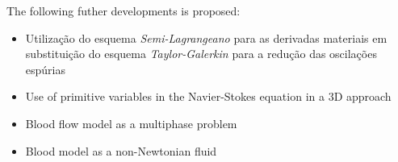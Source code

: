 \vspace{0.7cm}
\noindent
The following futher developments is proposed:

\begin{itemize}
 \vspace{-0.3cm}
 \item Utilização do esquema \textit{Semi-Lagrangeano} para as derivadas materiais
       em substituição do esquema \textit{Taylor-Galerkin}
       para a redução das oscilações espúrias  

 \item Use of primitive variables in the Navier-Stokes equation in a 3D approach
 
 \item Blood flow model as a multiphase problem

 \item Blood model as a non-Newtonian fluid
\end{itemize}








